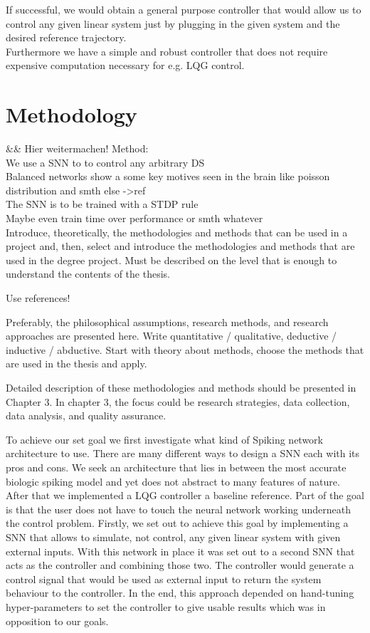 If successful, we would obtain a general purpose controller that would allow us to control any given linear system just by plugging in the given system and the desired reference trajectory.\\
Furthermore we have a simple and robust controller that does not require expensive computation necessary for e.g. LQG control.

\section{Methodology}
&& Hier weitermachen!
Method:\\
We use a SNN to to control any arbitrary DS\\
Balanced networks show a some key motives seen in the brain like poisson distribution and smth else ->ref\\
The SNN is to be trained with a STDP rule\\
Maybe even train time over performance or smth whatever\\

Introduce, theoretically, the methodologies and methods that can be used in a project and, then, select and introduce the methodologies and methods that are used in the degree project. Must be described on the level that is enough to understand the contents of the thesis.

Use references!

Preferably, the philosophical assumptions, research methods, and research approaches are presented here. Write quantitative / qualitative, deductive / inductive / abductive. Start with theory about methods, choose the methods that are used in the thesis and apply.


Detailed description of these methodologies and methods should be presented in Chapter 3. In chapter 3, the focus could be research strategies, data collection, data analysis, and quality assurance.

To achieve our set goal we first investigate what kind of Spiking network architecture to use. There are many different ways to design a \ac{SNN} each with its pros and cons.
We seek an architecture that lies in between the most accurate biologic spiking model and yet does not abstract to many features of nature.\\
After that we implemented a LQG controller a baseline reference.
Part of the goal is that the user does not have to touch the neural network working underneath the control problem.
Firstly, we set out to achieve this goal by implementing a \ac{SNN} that allows to simulate, not control, any given linear system with given external inputs. With this network in place it was set out to a second \ac{SNN} that acts as the controller and combining those two. The controller would generate a control signal that would be used as external input to return the system behaviour to the controller. In the end, this approach depended on hand-tuning hyper-parameters to set the controller to give usable results which was in opposition to our goals.\\

